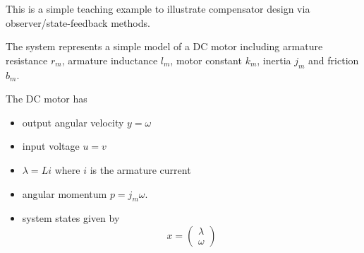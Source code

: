 

This is a simple teaching example to illustrate compensator design via
observer/state-feedback methods.

The system represents a simple model of a DC motor including armature
resistance $r_m$, armature inductance $l_m$, motor constant $k_m$,
inertia $j_m$ and friction $b_m$.

The DC motor has
\begin{itemize}
\item output angular velocity $y = \omega$
\item input voltage $u = v$
\item $\lambda = Li$ where $i$ is the armature current
\item angular momentum $p=j_m \omega$.
\item system states given by
  \begin{equation}
    x = 
    \begin{pmatrix}
      \lambda \\ \omega
    \end{pmatrix}
  \end{equation}
\end{itemize}

